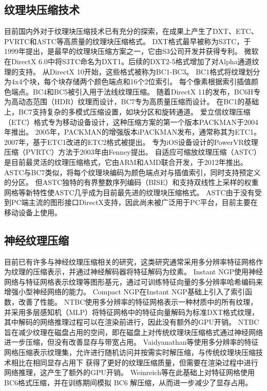 \subsection{纹理块压缩技术}
目前国内外对于纹理块压缩技术已有充分的探索，在成果上产生了DXT、ETC、PVRTC和ASTC等高质量的纹理块压缩格式。
DXT格式最早被称为S3TC\cite{iourcha1999system}，于1999年提出，是最早的纹理块压缩方案之一，它由S3公司开发并获得专利。
微软在DirectX 6.0中将S3TC命名为DXT1。后续的DXT2-5格式增加了对Alpha通道纹理的支持。
从DirectX 10开始，这些格式被称为BC1-BC3。
BC1格式将纹理划分为4x4个块，每个块存储两个颜色端点和16个2位索引。
每个像素根据索引插值颜色端点。BC4和BC5被引入用于法线纹理压缩。
随着DirectX 11的发布，BC6H专为高动态范围（HDR）纹理而设计，BC7专为高质量压缩而设计。
在BC1的基础上，BC7支持复杂的多模式压缩设置，如块分区和旋转通道。
爱立信纹理压缩（ETC）格式专为移动设备设计，这种压缩方案的第一个版本PACKMAN\cite{strom2004packman}于2004年推出。
2005年，PACKMAN的增强版本iPACKMAN\cite{strom2005packman}发布，通常称其为ETC1。
2007年，基于ETC1改进的ETC2\cite{strom2007etc}格式被提出。
专为iOS设备设计的PowerVR纹理压缩（PVRTC）方法于2003年由Fenney\cite{fenney2003texture}提出。
自适应可缩放纹理压缩（ASTC）\cite{nystad2012adaptive}是目前最灵活的纹理压缩格式，它由ARM和AMD联合开发，于2012年推出。
ASTC与BC7类似，将每个纹理块编码为颜色端点对与插值索引，同时支持预定义的分区。
但ASTC独特的有界整数序列编码（BISE）和支持双线性上采样的权重网格等新特性使ASTC几乎成为目前最先进的纹理块压缩格式。
ASTC由于没有受到PC端主流的图形接口DirectX支持，因此尚未被广泛用于PC平台，目前主要在移动设备上使用\cite{vaidyanathan2023random}。

\subsection{神经纹理压缩}

目前已有许多与神经纹理压缩相关的研究，这类研究通常采用多分辨率特征网格作为纹理的压缩表示，并通过神经解码器将特征解码为纹素。
Instant NGP\cite{muller2022instant}使用神经网络与特征网格表示纹理等图形基元，通过可训练特征向量的多分辨率哈希编码来增强小型神经网络的能力。
Compact NGP\cite{takikawa2023compact}在Instant NGP基础上引入了索引函数，改善了性能。
NTBC\cite{fujieda2024neural}使用多分辨率的特征网格表示一种材质中的所有纹理，并采用多层感知机（MLP）将特征网格中的特征向量解码为标准DXT格式纹理，
其中解码的网络推理过程可以在渲染前进行，因此没有额外的GPU开销。
NTBC旨在减少纹理在磁盘占用的空间，即在磁盘上对传统纹理块压缩格式通过神经网络进一步压缩，但没有改善显存与带宽占用。
Vaidyanathan等\cite{vaidyanathan2023random}使用多分辨率的特征网格压缩表示纹理集，允许进行随机访问并按需实时解压缩，与传统纹理块压缩技术相比在相同显存占用下
获得了更好的纹理压缩质量，但需要在渲染过程中进行网络推理，这产生了额外的GPU开销。
Weinreich等\cite{weinreich2024real}在此基础上对特征网格使用BC6格式压缩，并在训练期间模拟 BC6 解压缩，从而进一步减少了显存占用。

